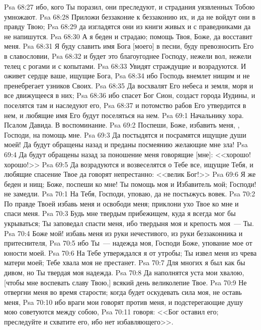 \vs Psa 68:27 ибо, кого Ты поразил, они  преследуют, и страдания уязвленных Тобою умножают.
\vs Psa 68:28 Приложи беззаконие к беззаконию их, и да не войдут они в правду Твою;
\vs Psa 68:29 да изгладятся они из книги живых и с праведниками да не напишутся.
\vs Psa 68:30 А я беден и страдаю; помощь Твоя, Боже, да восставит меня.
\vs Psa 68:31 Я буду славить имя Бога [моего] в песни, буду превозносить Его в славословии,
\vs Psa 68:32 и будет это благоугоднее Господу, нежели вол, нежели телец с рогами и с копытами.
\vs Psa 68:33 Увидят  страждущие и возрадуются. И оживет сердце ваше, ищущие Бога,
\vs Psa 68:34 ибо Господь внемлет нищим и не пренебрегает узников Своих.
\vs Psa 68:35 Да восхвалят Его небеса и земля, моря и все движущееся в них;
\vs Psa 68:36 ибо спасет Бог Сион, создаст города Иудины, и поселятся там и наследуют его,
\vs Psa 68:37 и потомство рабов Его утвердится в нем, и любящие имя Его будут поселяться на нем.
\vs Psa 69:1 Начальнику хора. Псалом Давида. В воспоминание.
\rsbpar\vs Psa 69:2 Поспеши, Боже, избавить меня, , Господи, на помощь мне.
\vs Psa 69:3 Да постыдятся и посрамятся ищущие души моей! Да будут обращены назад и преданы посмеянию желающие мне зла!
\vs Psa 69:4 Да будут обращены назад за поношение меня говорящие [мне]: <<хорошо! хорошо!>>
\vs Psa 69:5 Да возрадуются и возвеселятся о Тебе все, ищущие Тебя, и любящие спасение Твое да говорят непрестанно: <<велик Бог!>>
\vs Psa 69:6 Я же беден и нищ; Боже, поспеши ко мне! Ты помощь моя и Избавитель мой; Господи! не замедли.
\vs Psa 70:1 На Тебя, Господи, уповаю, да не постыжусь вовек.
\vs Psa 70:2 По правде Твоей избавь меня и освободи меня; приклони ухо Твое ко мне и спаси меня.
\vs Psa 70:3 Будь мне твердым прибежищем, куда я всегда мог бы укрываться; Ты заповедал спасти меня, ибо твердыня моя и крепость моя~--- Ты.
\vs Psa 70:4 Боже мой! избавь меня из руки нечестивого, из руки беззаконника и притеснителя,
\vs Psa 70:5 ибо Ты~--- надежда моя, Господи Боже, упование мое от юности моей.
\vs Psa 70:6 На Тебе утверждался я от утробы; Ты извел меня из чрева матери моей; Тебе хвала моя не престанет.
\vs Psa 70:7 Для многих я был как бы дивом, но Ты твердая моя надежда.
\vs Psa 70:8 Да наполнятся уста мои хвалою, [чтобы мне воспевать славу Твою,] всякий день великолепие Твое.
\vs Psa 70:9 Не отвергни меня во время старости; когда будет оскудевать сила моя, не оставь меня,
\vs Psa 70:10 ибо враги мои говорят против меня, и подстерегающие душу мою советуются между собою,
\vs Psa 70:11 говоря: <<Бог оставил его; преследуйте и схватите его, ибо нет избавляющего>>.
